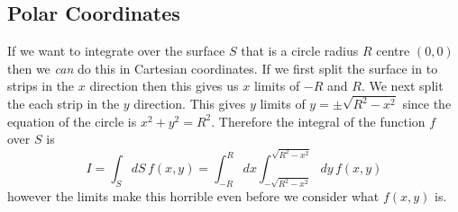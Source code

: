 \documentclass{article}
\begin{document}
    \subsection{Polar Coordinates}
    If we want to integrate over the surface \(S\) that is a circle radius \(R\) centre \((0, 0)\) then we \emph{can} do this in Cartesian coordinates.
    If we first split the surface in to strips in the \(x\) direction then this gives us \(x\) limits of \(-R\) and \(R\).
    We next split the each strip in the \(y\) direction.
    This gives \(y\) limits of \(y = \pm\sqrt{R^2 - x^2}\) since the equation of the circle is \(x^2 + y^2 = R^2\).
    Therefore the integral of the function \(f\) over \(S\) is
    \[I = \int_S dS\,f(x, y) = \int_{-R}^R dx\int_{-\sqrt{R^2 - x^2}}^{\sqrt{R^2 - x^2}} dy\,f(x, y)\]
    however the limits make this horrible even before we consider what \(f(x, y)\) is.
    
\end{document}
